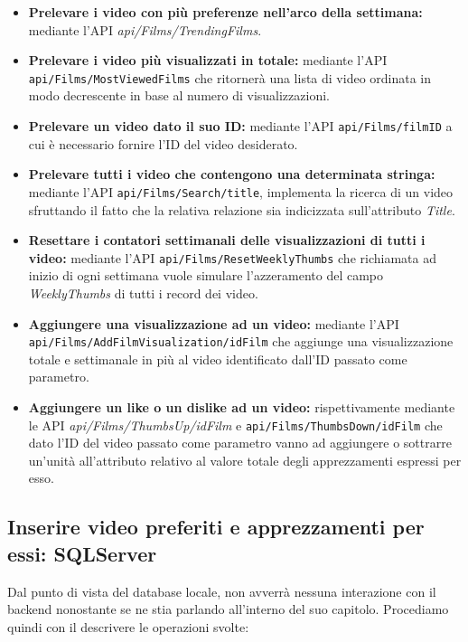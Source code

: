 \documentclass[a4]{book}
\begin{document}
\begin{itemize}
	\item \textbf{Prelevare i video con più preferenze nell'arco della settimana:} mediante l'API \textit{api/Films/TrendingFilms}.
	
	\item \textbf{Prelevare i video più visualizzati in totale:} mediante l'API \texttt{api/Films/MostViewedFilms} che ritornerà una lista di video ordinata in modo decrescente in base al numero di visualizzazioni.
	
	\item \textbf{Prelevare un video dato il suo ID:} mediante l'API \texttt{api/Films/{filmID}} a cui è necessario fornire l'ID del video desiderato.
	
	\item \textbf{Prelevare tutti i video che contengono una determinata stringa:} mediante l'API \texttt{api/Films/Search/{title}}, implementa la ricerca di un video sfruttando il fatto che la relativa relazione sia indicizzata sull'attributo \textit{Title}.
	
	
	\item \textbf{Resettare i contatori settimanali delle visualizzazioni di tutti i video:} mediante l'API \texttt{api/Films/ResetWeeklyThumbs} che richiamata ad inizio di ogni settimana vuole simulare l'azzeramento del campo \textit{WeeklyThumbs} di tutti i record dei video.
	
	\item \textbf{Aggiungere una visualizzazione ad un video:} mediante l'API \texttt{api/Films/AddFilmVisualization/{idFilm}} che aggiunge una visualizzazione totale e settimanale in più al video identificato dall'ID passato come parametro.
	
	\item \textbf{Aggiungere un like o un dislike ad un video:} rispettivamente mediante le API \textit{api/Films/ThumbsUp/{idFilm}} e \texttt{api/Films/ThumbsDown/{idFilm}} che dato l'ID del video passato come parametro vanno ad aggiungere o sottrarre un'unità all'attributo relativo al valore totale degli apprezzamenti espressi per esso.
	

\end{itemize}

\subsection{Inserire video preferiti e apprezzamenti per essi: SQLServer}

Dal punto di vista del database locale, non avverrà nessuna interazione con il backend nonostante se ne stia parlando all'interno del suo capitolo. Procediamo quindi con il descrivere le operazioni svolte:
\end{document}
